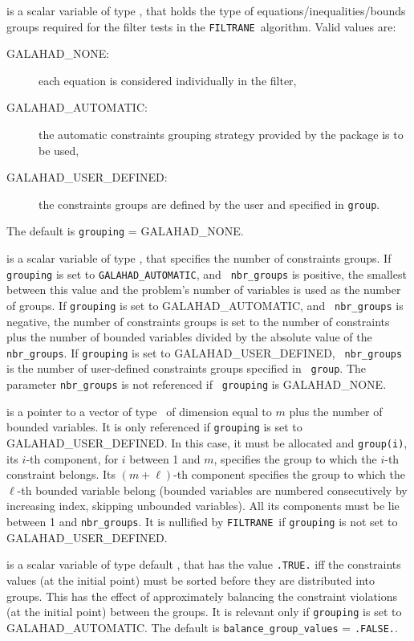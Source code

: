 \documentclass{galahad}
\newcommand{\packagename}{FILTRANE}
\newcommand{\sym}{\sf\small}
\newcommand{\filtrane}{{\tt \packagename}}
\begin{document}
\begin{description}
 is a scalar variable of type \integer, that holds the
type of equations/inequalities/bounds groups required for the filter tests in
the \filtrane\ algorithm. Valid values are:
\begin{description}
\item[\sym GALAHAD\_NONE:] 
each equation is considered individually in the filter,
\item[\sym GALAHAD\_AUTOMATIC:] the automatic constraints grouping strategy 
provided by the package is to be used,
\item[\sym GALAHAD\_USER\_DEFINED:] the constraints groups are defined by 
the user and specified in {\tt group}.
\end{description}
The default is {\tt grouping} = {\sym GALAHAD\_NONE}.

 is a scalar variable of type \integer, that
specifies the number of constraints groups. 
If {\tt grouping} is set to {\tt GALAHAD\_AUTOMATIC}, and {\tt
nbr\_groups} is positive, the smallest between this value and the
problem's number of variables is used as the number of groups.
If {\tt grouping} is set to {\sym GALAHAD\_AUTOMATIC}, and {\tt
nbr\_groups} is negative, the number of constraints groups is set to 
the number of constraints plus the number of bounded variables
divided by the absolute value of the {\tt nbr\_groups}.
If {\tt grouping} is set to {\sym GALAHAD\_USER\_DEFINED}, {\tt
nbr\_groups} is the number of user-defined constraints groups specified in {\tt
group}. The parameter {\tt nbr\_groups} is not referenced if {\tt
grouping} is {\sym GALAHAD\_NONE}.

 is a pointer to a vector of type \integer\ of dimension
equal to $m$ plus the number of bounded variables. It is only referenced if
{\tt grouping} is set to {\sym GALAHAD\_USER\_DEFINED}. In this case,
it must be allocated and {\tt group(i)}, its $i$-th component, for $i$ between
1 and $m$, specifies the group to which the $i$-th constraint belongs. Its
$(m+\ell)$-th component specifies the group to which the $\ell$-th bounded
variable belong (bounded variables are numbered consecutively by increasing
index, skipping unbounded variables). All its components must be
lie between 1 and {\tt nbr\_groups}.  It is nullified by \filtrane\ if
{\tt grouping} is not set to {\sym GALAHAD\_USER\_DEFINED}.

 is a scalar variable of type default \logical, 
that has the value {\tt .TRUE.} iff the constraints values (at the initial
point) must be sorted before they are distributed into groups.
This has the effect of approximately balancing the 
constraint violations (at the initial point) between the groups. It is
relevant only if {\tt grouping} is set to {\sym GALAHAD\_AUTOMATIC}.
The default is {\tt balance\_group\_values} = {\tt .FALSE.}.


\end{description}
\end{document}
